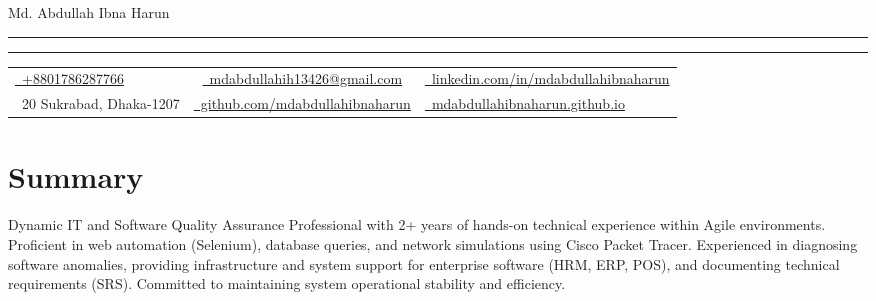 \documentclass[letterpaper,10pt]{article}
\newcommand{\documentTitle}[2]{
  \begin{center}
    {\Huge\color{accentTitle} #1}
    \vspace{6pt}
    {\color{accentLine} \hrule}
    \vspace{2pt}
    {\color{accentLine} \hrule}
    \vspace{6pt}
    \footnotesize{#2}
  \end{center}
}
\begin{document}
\documentTitle{Md. Abdullah Ibna Harun}{
  \begin{tabular}{@{} p{6.1cm} @{\hfill} c @{\hfill} p{6.1cm} @{}}
    \href{tel:+8801786287766}{\raisebox{-0.07\height} \faPhone\ +8801786287766} & 
    \href{mailto:mdabdullahih13426@gmail.com}{\raisebox{-0.15\height} \faEnvelope\ mdabdullahih13426@gmail.com} & 
    \hfill\href{https://linkedin.com/in/mdabdullahibnaharun}{\raisebox{-0.15\height} \faLinkedin\ linkedin.com/in/mdabdullahibnaharun} \\ [4pt]
    \raisebox{-0.05\height} \faHome\ 20 Sukrabad, Dhaka-1207 & 
    \href{https://github.com/mdabdullahibnaharun}{\raisebox{-0.15\height} \faGithub\ github.com/mdabdullahibnaharun} & 
    \hfill\href{http://mdabdullahibnaharun.github.io/}{\raisebox{-0.15\height} \faGlobe\ mdabdullahibnaharun.github.io}
  \end{tabular}
}

\section{Summary}
Dynamic IT and Software Quality Assurance Professional with 2+ years of hands-on technical experience within Agile environments. Proficient in web automation (Selenium), database queries, and network simulations using Cisco Packet Tracer. Experienced in diagnosing software anomalies, providing infrastructure and system support for enterprise software (HRM, ERP, POS), and documenting technical requirements (SRS). Committed to maintaining system operational stability and efficiency.
\end{document}
